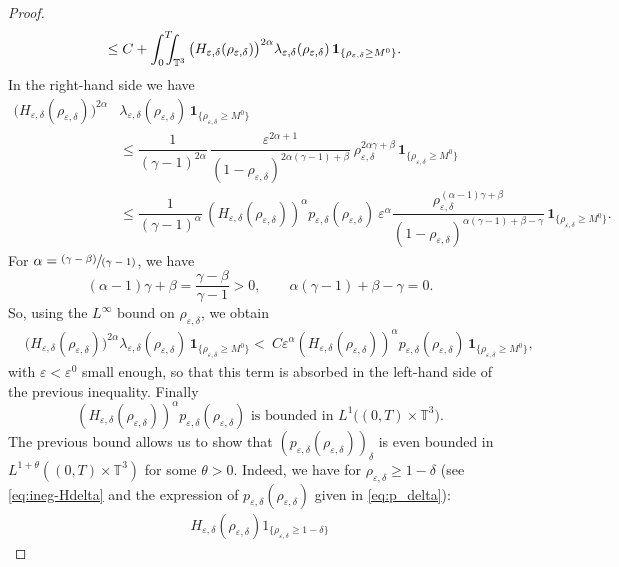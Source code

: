 \documentclass[JEP,XML,SOM,Unicode,NoEqCountersInSection]{cedram}
\newcommand{\<}{\bigl\langle}
\renewcommand{\>}{\bigr\rangle}
\newcommand{\pspfrac}[2]{\sfrac{(#1)}{(#2)}}
\newcommand{\intTTT}{\int_0^T\hspace*{-2.5mm}\int_{\TT}}
\newcommand{\labeleq}[1]{}
\theoremstyle{definition}
\theoremstyle{remark}
\newcommand{\TT}{\mathbb{T}^3}
\let\ep\varepsilon
\begin{document}
\begin{proof}
\begin{align*}
& \leq C + \intTTT{\big(H_{\ep,\delta}(\rho_{\ep,\delta}) \big)^{2\alpha}\lambda_{\ep,\delta}(\rho_{\ep,\delta}) \,\mathbf{1}_{\{ \rho_{\ep,\delta} \geq M^0 \}} }.
\end{align*}
In the right-hand side we have
\begin{align*}
\big(H_{\ep,\delta}(\rho_{\ep,\delta})\big)^{2\alpha}&\lambda_{\ep,\delta}(\rho_{\ep,\delta}) \,\mathbf{1}_{\{ \rho_{\ep,\delta} \geq M^0 \}}\\
&\leq \dfrac{1}{(\gamma-1)^{2\alpha}}\,\dfrac{\ep^{2\alpha + 1}}{(1-\rho_{\ep,\delta})^{2\alpha (\gamma-1) + \beta}} \ \rho_{\ep,\delta}^{2\alpha\gamma + \beta}\,\mathbf{1}_{\{ \rho_{\ep,\delta} \geq M^0 \}} \\
& \leq \dfrac{1}{(\gamma-1)^{\alpha}}\,\left(H_{\ep,\delta}(\rho_{\ep,\delta})\right)^{\alpha} p_{\ep,\delta}(\rho_{\ep,\delta}) \ \ep^\alpha \dfrac{\rho_{\ep,\delta}^{(\alpha-1) \gamma + \beta}}{(1-\rho_{\ep,\delta})^{\alpha(\gamma-1)+\beta-\gamma}}\,\mathbf{1}_{\{ \rho_{\ep,\delta} \geq M^0 \}}.
\end{align*}
For $\alpha = \pspfrac{\gamma - \beta}{\gamma-1}$, we have
\[
(\alpha-1)\gamma+\beta = \dfrac{\gamma-\beta}{\gamma-1} > 0,
\qquad \alpha(\gamma-1)+\beta-\gamma = 0.
\]
So, using the $L^\infty$ bound on $\rho_{\ep,\delta}$, we obtain
\begin{align*}
&\big(H_{\ep,\delta}(\rho_{\ep,\delta})\big)^{2\alpha}\lambda_{\ep,\delta}(\rho_{\ep,\delta}) \,\mathbf{1}_{\{ \rho_{\ep,\delta} \geq M^0 \}}
< \ C\ep^\alpha \left(H_{\ep,\delta}(\rho_{\ep,\delta})\right)^{\alpha} p_{\ep,\delta}(\rho_{\ep,\delta}) \,\mathbf{1}_{\{ \rho_{\ep,\delta} \geq M^0 \}},
\end{align*}
with $\ep< \ep^0$ small enough, so that this term is absorbed in the left-hand side of the previous inequality.
Finally
\begin{equation*}\labeleq{add_control_p_delta}
\left(H_{\ep,\delta}(\rho_{\ep,\delta})\right)^{\alpha} p_{\ep,\delta}(\rho_{\ep,\delta}) \text{ is bounded in } L^1\big((0,T)\times \TT\big).
\end{equation*} 
The previous bound allows us to show that $(p_{\ep,\delta}(\rho_{\ep,\delta}))_\delta$ is even bounded in $L^{1+\theta}((0,T)\times \TT)$ for some $\theta > 0$.
Indeed, we have for $\rho_{\varepsilon,\delta} \ge 1-\delta$ (see \eqref{eq:ineg-Hdelta}
and the expression of $p_{\varepsilon,\delta}(\rho_{\varepsilon,\delta})$ given in \eqref{eq:p_delta}):
\begin{align*}
H_{\varepsilon,\delta}(\rho_{\varepsilon,\delta}) 1_{\{\rho_{\varepsilon,\delta} \geq 1-\delta\}}

\end{align*}
\end{proof}
\end{document}
